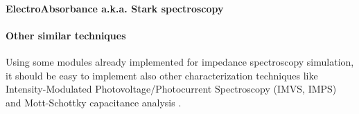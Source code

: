 \paragraph{ElectroAbsorbance a.k.a. Stark spectroscopy}


\paragraph{Other similar techniques}
Using some modules already implemented for impedance spectroscopy simulation, it should be easy to implement also other characterization techniques like Intensity-Modulated Photovoltage/Photocurrent Spectroscopy (IMVS, IMPS) \cite{Pockett2015,Guillen2014} and Mott-Schottky capacitance analysis \cite{Almora2016}.



